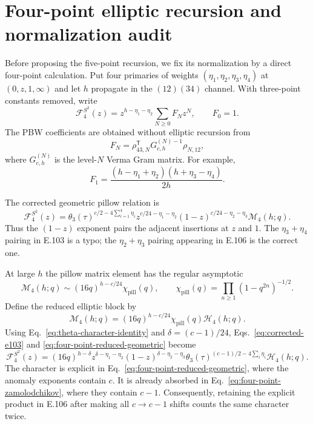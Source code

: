 \documentclass[11pt]{article}
\newcommand{\cF}{\mathcal F}
\newcommand{\cH}{\mathcal H}
\newcommand{\cM}{\mathcal M}
\begin{document}
\section{Four-point elliptic recursion and normalization audit}
\label{sec:four-point-audit}

Before proposing the five-point recursion, we fix its normalization by a
direct four-point calculation.  Put four primaries of weights
$(\eta_1,\eta_2,\eta_3,\eta_4)$ at $(0,z,1,\infty)$ and let $h$ propagate
in the $(12)(34)$ channel.  With three-point constants removed, write
\begin{equation}
 \cF^{S^2}_4(z)
 =z^{h-\eta_1-\eta_2}\sum_{N\geq0}F_Nz^N,
 \qquad F_0=1.
 \label{eq:four-point-plane-block}
\end{equation}
The PBW coefficients are obtained without elliptic recursion from
\begin{equation}
 F_N=\rho_{43,N}^{\mathsf T}G_{c,h}^{(N)-1}\rho_{N,12},
 \label{eq:four-point-pbw}
\end{equation}
where $G_{c,h}^{(N)}$ is the level-$N$ Verma Gram matrix.  For example,
\begin{equation}
 F_1=\frac{(h-\eta_1+\eta_2)(h+\eta_3-\eta_4)}{2h}.
 \label{eq:four-point-level-one}
\end{equation}

The corrected geometric pillow relation is
\begin{equation}
 \boxed{
 \cF^{S^2}_4(z)
 =\theta_3(\tau)^{c/2-4\sum_{i=1}^4\eta_i}
  z^{c/24-\eta_1-\eta_2}
  (1-z)^{c/24-\eta_2-\eta_3}\cM_4(h;q).}
 \label{eq:corrected-e103}
\end{equation}
Thus the $(1-z)$ exponent pairs the adjacent insertions at $z$ and $1$.
The $\eta_3+\eta_4$ pairing in E.103 is a typo; the
$\eta_2+\eta_3$ pairing appearing in E.106 is the correct one.

At large $h$ the pillow matrix element has the regular asymptotic
\begin{equation}
 \cM_4(h;q)
 \sim(16q)^{h-c/24}\chi_{\mathrm{pill}}(q),
 \qquad
 \chi_{\mathrm{pill}}(q)
 =\prod_{n\geq1}(1-q^{2n})^{-1/2}.
 \label{eq:four-point-large-h}
\end{equation}
Define the reduced elliptic block by
\begin{equation}
 \cM_4(h;q)
 =(16q)^{h-c/24}\chi_{\mathrm{pill}}(q)\cH_4(h;q).
 \label{eq:four-point-reduced-geometric}
\end{equation}
Using Eq.~\eqref{eq:theta-character-identity} and
$\delta=(c-1)/24$, Eqs.~\eqref{eq:corrected-e103} and
\eqref{eq:four-point-reduced-geometric} become
\begin{equation}
 \boxed{
 \cF^{S^2}_4(z)
 =(16q)^{h-\delta}
  z^{\delta-\eta_1-\eta_2}
  (1-z)^{\delta-\eta_2-\eta_3}
  \theta_3(\tau)^{(c-1)/2-4\sum_i\eta_i}\cH_4(h;q).}
 \label{eq:four-point-zamolodchikov}
\end{equation}
The character is explicit in
Eq.~\eqref{eq:four-point-reduced-geometric}, where the anomaly exponents
contain $c$.  It is already absorbed in
Eq.~\eqref{eq:four-point-zamolodchikov}, where they contain $c-1$.
Consequently, retaining the explicit product in E.106 after making all
$c\to c-1$ shifts counts the same character twice.
\end{document}
